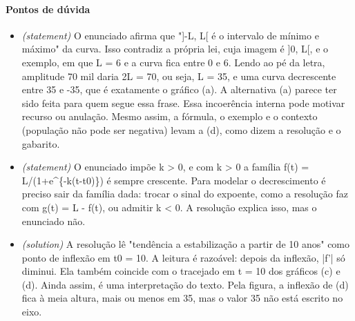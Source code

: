 \documentclass{article}%
\begin{document}
\paragraph{Pontos de dúvida}%
\begin{itemize}%
\item%
\textit{(statement)} O enunciado afirma que "{]}-L, L{[} é o intervalo de mínimo e máximo" da curva. Isso contradiz a própria lei, cuja imagem é {]}0, L{[}, e o exemplo, em que L = 6 e a curva fica entre 0 e 6. Lendo ao pé da letra, amplitude 70 mil daria 2L = 70, ou seja, L = 35, e uma curva decrescente entre 35 e -35, que é exatamente o gráfico (a). A alternativa (a) parece ter sido feita para quem segue essa frase. Essa incoerência interna pode motivar recurso ou anulação. Mesmo assim, a fórmula, o exemplo e o contexto (população não pode ser negativa) levam a (d), como dizem a resolução e o gabarito.%
\item%
\textit{(statement)} O enunciado impõe k > 0, e com k > 0 a família f(t) = L/(1+e\^{}\{-k(t-t0)\}) é sempre crescente. Para modelar o decrescimento é preciso sair da família dada: trocar o sinal do expoente, como a resolução faz com g(t) = L - f(t), ou admitir k < 0. A resolução explica isso, mas o enunciado não.%
\item%
\textit{(solution)} A resolução lê "tendência a estabilização a partir de 10 anos" como ponto de inflexão em t0 = 10. A leitura é razoável: depois da inflexão, |f'| só diminui. Ela também coincide com o tracejado em t = 10 dos gráficos (c) e (d). Ainda assim, é uma interpretação do texto. Pela figura, a inflexão de (d) fica à meia altura, mais ou menos em 35, mas o valor 35 não está escrito no eixo.%
\end{itemize}%
\end{document}
